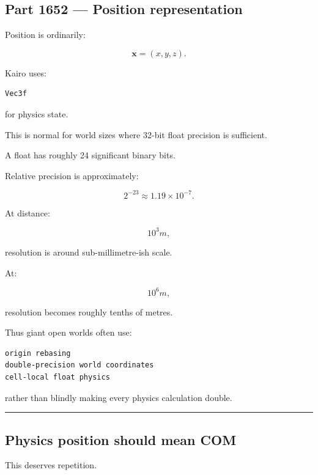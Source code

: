 \subsection{Part 1652 --- Position representation}\label{06-engine-ii-ch037-part-1652-position-representation}

\hypertarget{06-engine-ii-ch037-part-1652-position-representation}{}

Position is ordinarily:

\[
\mathbf x=(x,y,z).
\]

Kairo uses:

\begin{verbatim}
Vec3f
\end{verbatim}

for physics state.

This is normal for world sizes where 32-bit float precision is sufficient.

A float has roughly 24 significant binary bits.

Relative precision is approximately:

\[
2^{-23}
\approx1.19\times10^{-7}.
\]

At distance:

\[
10^3m,
\]

resolution is around sub-millimetre-ish scale.

At:

\[
10^6m,
\]

resolution becomes roughly tenths of metres.

Thus giant open worlds often use:

\begin{verbatim}
origin rebasing
double-precision world coordinates
cell-local float physics
\end{verbatim}

rather than blindly making every physics calculation double.

\begin{center}\rule{0.5\linewidth}{0.5pt}\end{center}

\subsection{Physics position should mean COM}\label{06-engine-ii-ch037-physics-position-should-mean-com}

\hypertarget{06-engine-ii-ch037-physics-position-should-mean-com}{}

This deserves repetition.

